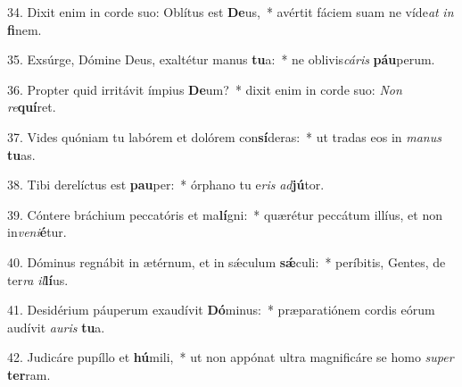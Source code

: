34. Dixit enim in corde suo: Oblítus est \textbf{De}us,~*  avértit fáciem suam ne víde\textit{at} \textit{in} \textbf{fi}nem.\

35. Exsúrge, Dómine Deus, exaltétur manus \textbf{tu}a:~*  ne oblivis\textit{cá}\textit{ris} \textbf{páu}perum.\

36. Propter quid irritávit ímpius \textbf{De}um?~*  dixit enim in corde suo: \textit{Non} \textit{re}\textbf{quí}ret.\

37. Vides quóniam tu labórem et dolórem con\textbf{sí}deras:~*  ut tradas eos in \textit{ma}\textit{nus} \textbf{tu}as.\

38. Tibi derelíctus est \textbf{pau}per:~*  órphano tu e\textit{ris} \textit{ad}\textbf{jú}tor.\

39. Cóntere bráchium peccatóris et ma\textbf{lí}gni:~*  quærétur peccátum illíus, et non in\textit{ve}\textit{ni}\textbf{é}tur.\

40. Dóminus regnábit in ætérnum, et in sǽculum \textbf{sǽ}culi:~*  períbitis, Gentes, de ter\textit{ra} \textit{il}\textbf{lí}us.\

41. Desidérium páuperum exaudívit \textbf{Dó}minus:~*  præparatiónem cordis eórum audívit \textit{au}\textit{ris} \textbf{tu}a.\

42. Judicáre pupíllo et \textbf{hú}mili,~*  ut non appónat ultra magnificáre se homo \textit{su}\textit{per} \textbf{ter}ram.\

